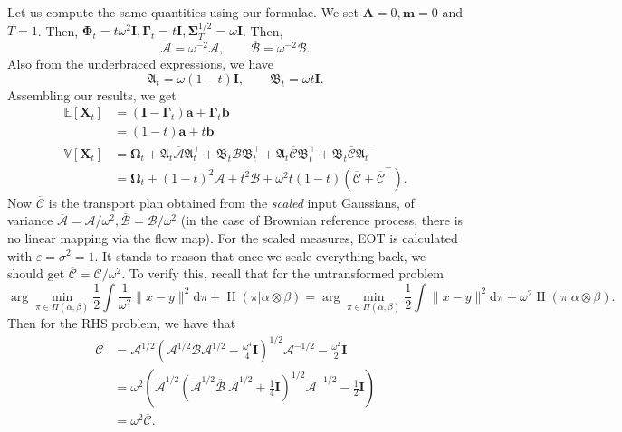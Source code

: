 \documentclass{article}
\newcommand{\Ent}{\operatorname{H}}
\newcommand{\diff}{\mathrm{d}}
\newcommand{\E}{\mathbb{E}}
\newcommand{\V}{\mathbb{V}}
\newcommand{\Id}{\mathbf{I}}
\newcommand{\Ac}{\mathcal{A}}
\newcommand{\Bc}{\mathcal{B}}
\newcommand{\Cc}{\mathcal{C}}
\newcommand{\bmathfrak}[1]{\bm{\mathfrak{#1}}}
\theoremstyle{newstyle}
\begin{document}
Let us compute the same quantities using our formulae. We set $\bm{A} = 0, \bm{m} = 0$ and $T = 1$. Then, $\bm{\Phi}_t = t\omega^2 \Id, \bm{\Gamma}_t = t \Id, \bm{\Sigma}_T^{1/2} = \omega \Id$. 
Then,
\[
  \overline{\bm{\Ac}} = \omega^{-2} \bm{\Ac}, \qquad \overline{\bm{\Bc}} = \omega^{-2} \bm{\Bc}. 
\]
Also from the underbraced expressions, we have
\[
  \bmathfrak{A}_t = \omega (1 - t) \Id, \qquad \bmathfrak{B}_t = \omega t \Id. 
\]
Assembling our results, we get
\begin{align*}
  \E[\bm{X}_t] &= (\Id - \bm{\Gamma}_t) \bm{a} + \bm{\Gamma}_t \bm{b} \\
          &= (1-t) \bm{a} + t \bm{b} \\
  \V[\bm{X}_t] &= \bm{\Omega}_t + \bmathfrak{A}_t \bm{\overline{\Ac}} \bmathfrak{A}_t^\top + \bmathfrak{B}_t \bm{\overline{\Bc}} \bmathfrak{B}_t^\top + \bmathfrak{A}_t \bm{\overline{\Cc}} \bmathfrak{B}_t^\top + \bmathfrak{B}_t \bm{\overline{\Cc}} \bmathfrak{A}_t^\top \\
          &= \bm{\Omega}_t + (1-t)^2 \bm{\Ac} + t^2 \bm{\Bc} + \omega^2 t(1 - t) (\bm{\overline{\Cc}} + \bm{\overline{\Cc}}^\top). 
\end{align*}
Now $\bm{\overline{\Cc}}$ is the transport plan obtained from the \emph{scaled} input Gaussians, of variance $\overline{\bm{\Ac}} = \bm{\Ac} / \omega^2, \overline{\bm{\Bc}} = \bm{\Bc} / \omega^2$ (in the case of Brownian reference process, there is no linear mapping via the flow map).
For the scaled measures, EOT is calculated with $\varepsilon = \sigma^2 = 1$.
It stands to reason that once we scale everything back, we should get $\overline{\bm{\Cc}} = \bm{\Cc} / \omega^2$. To verify this, recall that for the untransformed problem
\[
  \arg\min_{\pi \in \Pi(\alpha, \beta)} \frac{1}{2} \int \frac{1}{\omega^2} \| x - y \|^2  \diff \pi + \Ent(\pi | \alpha \otimes \beta) = \arg\min_{\pi \in \Pi(\alpha, \beta)} \frac{1}{2} \int \| x - y \|^2  \diff \pi + \omega^2 \Ent(\pi | \alpha \otimes \beta). 
\]
Then for the RHS problem, we have that
\begin{align*}
  \bm{\Cc} &= \bm{\Ac}^{1/2} (\bm{\Ac}^{1/2} \bm{\Bc} \bm{\Ac}^{1/2} - \frac{\omega^4}{4} \Id)^{1/2} \bm{\Ac}^{-1/2} - \frac{\omega^2}{2} \Id \\
    &= \omega^2 (\overline{\bm{\Ac}}^{1/2} (\overline{\bm{\Ac}}^{1/2} \overline{\bm{\Bc}}\:\overline{\bm{\Ac}}^{1/2} + \frac{1}{4} \Id )^{1/2} \overline{\bm{\Ac}}^{-1/2} - \frac{1}{2} \Id ) \\
    &= \omega^2 \overline{\bm{\Cc}}. 
\end{align*}
\end{document}
